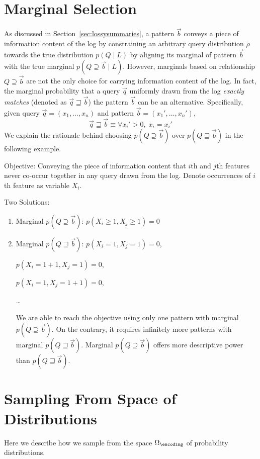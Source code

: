\section{Marginal Selection}
\label{appendix:marginalselectionforpatternbasedsummary}
As discussed in Section~\ref{sec:lossysummaries}, a pattern $\vec b$ conveys a piece of information content of the log by constraining an arbitrary query distribution $\rho$ towards the true distribution $p(Q\;|\;L)$ by aligning its marginal of pattern $\vec b$ with the true marginal $p(Q\supseteq\vec{b}\;|\;L)$. 
However, marginals based on relationship $Q\supseteq\vec b$ are not the only choice for carrying information content of the log. 
In fact, the marginal probability that a query $\vec{q}$ uniformly drawn from the log \textit{exactly matches} (denoted as $\vec{q}\sqsupseteq\vec{b}$) the pattern $\vec{b}$ can be an alternative. Specifically, given query $\vec{q}=(x_1,\ldots,x_n)$ and pattern $\vec{b}=(x_1',\ldots,x_n')$, 
$$\vec{q}\sqsupseteq\vec{b}\equiv\forall x_i'>0,\;x_i=x_i'$$
We explain the rationale behind choosing $p(Q\supseteq\vec{b})$ over $p(Q\sqsupseteq\vec{b})$ in the following example.
\begin{example}
Objective: Conveying the piece of information content that $i$th and $j$th features never co-occur together in any query drawn from the log.
Denote occurrences of $i$th feature as variable $X_i$.

Two Solutions: 
\begin{enumerate}
\item Marginal $p(Q\supseteq\vec{b})$: $p(X_i\geq 1,X_j\geq 1)=0$

\item Marginal $p(Q\sqsupseteq\vec{b})$:
$p(X_i=1,X_j=1)=0$,

$p(X_i=1+1,X_j=1)=0$,

$p(X_i=1,X_j=1+1)=0$,

\ldots

We are able to reach the objective using only one pattern with marginal $p(Q\supseteq\vec{b})$. 
On the contrary, it requires infinitely more patterns with marginal $p(Q\sqsupseteq\vec{b})$.
Marginal $p(Q\supseteq\vec{b})$ offers more descriptive power than $p(Q\sqsupseteq\vec{b})$.
\end{enumerate}
\end{example}

\section{Sampling From Space of Distributions}
\label{appendix:sampling}
Here we describe how we sample from the space $\Omega_\encoding$ of probability distributions.

